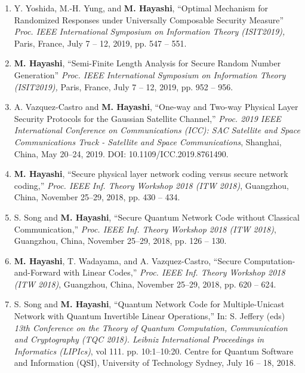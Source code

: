 \documentclass[a4paper,12pt,oneside]{article}
\begin{document}
\begin{enumerate}
    \item
    Y. Yoshida, M.-H. Yung, and \textbf{M. Hayashi}, 
    ``Optimal Mechanism for Randomized Responses under Universally Composable Security Measure'' 
    {\em Proc. IEEE International Symposium on Information Theory (ISIT2019),} 
    Paris, France, July 7 -- 12, 2019, pp. 547 -- 551. 
    
    \item
    \textbf{M. Hayashi}, 
    ``Semi-Finite Length Analysis for Secure Random Number Generation'' 
    {\em Proc. IEEE International Symposium on Information Theory (ISIT2019),} 
    Paris, France, July 7 -- 12, 2019, pp. 952 -- 956. 
    
    \item
    A. Vazquez-Castro and \textbf{M. Hayashi}, 
    ``One-way and Two-way Physical Layer Security Protocols for the Gaussian Satellite Channel,'' 
    {\em Proc. 2019 IEEE International Conference on Communications (ICC): SAC Satellite and Space Communications Track - Satellite and Space Communications},
    Shanghai, China, May 20--24, 2019. DOI: 10.1109/ICC.2019.8761490.
    
    \item
    \textbf{M. Hayashi}, 
    ``Secure physical layer network coding versus secure network coding,''
    {\em Proc. IEEE Inf. Theory Workshop 2018 (ITW 2018)}, 
    Guangzhou, China, November 25--29, 2018, pp. 430 -- 434. 
    
    \item
    S. Song and \textbf{M. Hayashi}, 
    ``Secure Quantum Network Code without Classical Communication,''
    {\em Proc. IEEE Inf. Theory Workshop 2018 (ITW 2018)}, 
    Guangzhou, China, November 25--29, 2018, pp. 126 -- 130. 
    
    \item
    \textbf{M. Hayashi}, T. Wadayama, and A. Vazquez-Castro,
    ``Secure Computation-and-Forward with Linear Codes,''
    {\em Proc. IEEE Inf. Theory Workshop 2018 (ITW 2018)}, 
    Guangzhou, China, November 25--29, 2018, pp. 620 -- 624. 
    
    \item
    S. Song and \textbf{M. Hayashi}, 
    ``Quantum Network Code for Multiple-Unicast Network with Quantum Invertible Linear Operations,''
    In: S. Jeffery (eds) 
    {\em 13th Conference on the Theory of Quantum Computation, Communication and Cryptography (TQC 2018). Leibniz International Proceedings in Informatics (LIPIcs)},
     vol 111. pp. 10:1--10:20.
    Centre for Quantum Software and Information (QSI), University of Technology Sydney, 
    July 16 -- 18, 2018.
    

\end{enumerate}
\end{document}
